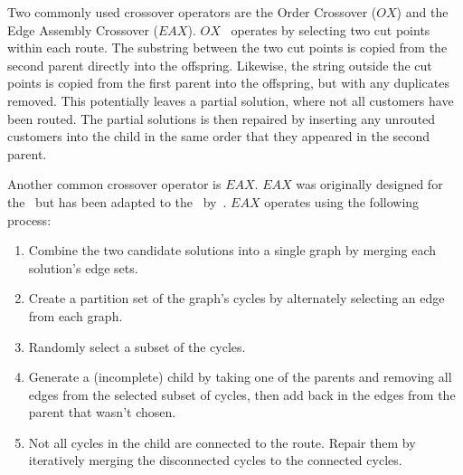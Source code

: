 Two commonly used crossover operators are the Order Crossover ($OX$) and the Edge Assembly Crossover ($EAX$). $OX$~\cite{OSH:1987} operates by selecting two cut points within each route. The substring between the two cut points is copied from the second parent directly into the offspring. Likewise, the string outside the cut points is copied from the first parent into the offspring, but with any duplicates removed. This potentially leaves a partial solution, where not all customers have been routed. The partial solutions is then repaired by inserting any unrouted customers into the child in the same order that they appeared in the second parent.


Another common crossover operator is $EAX$. $EAX$ was originally designed for the \TSP\ but has been adapted to the \VRP\ by~\cite{Nagata:2007}. $EAX$ operates using the following process:

\begin{enumerate}
    \item Combine the two candidate solutions into a single graph by merging each solution's edge sets.
    \item Create a partition set of the graph's cycles by alternately selecting an edge from each graph.
    \item Randomly select a subset of the cycles.
    \item Generate a (incomplete) child by taking one of the parents and removing all edges from the selected subset of cycles, then add back in the edges from the parent that wasn't chosen. 
    \item Not all cycles in the child are connected to the route. Repair them by iteratively merging the disconnected cycles to the connected cycles.
\end{enumerate}


